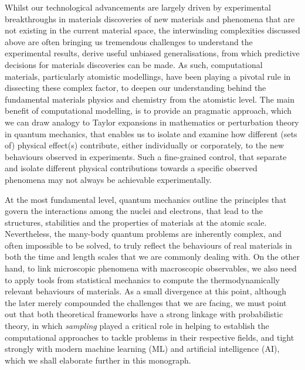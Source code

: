 Whilst our technological advancements are largely driven by experimental breakthroughs in materials discoveries of new materials and phenomena that are not existing in the current material space, the interwinding complexities discussed above are often bringing us tremendous challenges to understand the experimental results, derive useful unbiased generalisations, from which predictive decisions for materials discoveries can be made. As such, computational materials, particularly atomistic modellings, have been playing a pivotal rule in dissecting these complex factor, to deepen our understanding behind the fundamental materials physics and chemistry from the atomistic level. The main benefit of computational modelling, is to provide an pragmatic approach, which we can draw analogy to Taylor expansions in mathematics or perturbation theory in quantum mechanics, that enables us to isolate and examine how different (sets of) physical effect(s) contribute, either individually or corporately, to the new behaviours observed in experiments. Such a fine-grained control, that separate and isolate different physical contributions towards a specific observed phenomena may not always be achievable experimentally. 

At the most fundamental level, quantum mechanics outline the principles that govern the interactions among the nuclei and electrons, that lead to the  structures, stabilities and the properties of materials at the atomic scale. Nevertheless, the many-body quantum problems\cite{mahan2000many} are inherently complex, and often impossible to be solved, to truly reflect the behaviours of real materials in both the time and length scales that we are commonly dealing with. On the other hand, to link microscopic phenomena with macroscopic observables, we also need to apply tools from statistical mechanics to compute the thermodynamically relevant behaviours of materials. As a small divergence at this point, although the later merely compounded the challenges that we are facing, we must point out that both theoretical frameworks have a strong linkage with probabilistic theory, in which \emph{sampling} played a critical role in helping to establish the computational approaches to tackle problems in their respective fields, and tight strongly with modern machine learning (ML) and artificial intelligence (AI),\cite{murphy2012machine} which we shall elaborate further in this monograph.

